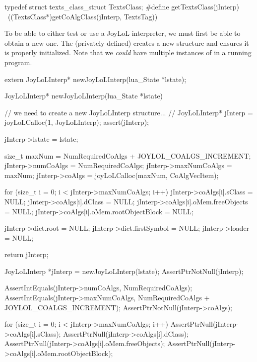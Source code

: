 typedef struct texts_class_struct TextsClass;
#define getTextsClass(jInterp)                              \
  ((TextsClass*)getCoAlgClass(jInterp, TextsTag))
\stopCHeader

\startTestSuite[newJoyLoLInterp]

To be able to either test or use a JoyLoL interpreter, we must first be 
able to obtain a new one. The (privately defined) \type{newJoyLoLInterp} 
creates a new  structure and ensures it is properly 
initialized. Note that we \emph{could} have multiple instances of 
\type{JoyLoLInterp} in a running program. 

\startCHeader
extern JoyLoLInterp* newJoyLoLInterp(lua_State *lstate);
\stopCHeader
{}

\startCCode
JoyLoLInterp* newJoyLoLInterp(lua_State *lstate) {
  // we need to create a new JoyLoLInterp structure...
  //
  JoyLoLInterp* jInterp = joyLoLCalloc(1, JoyLoLInterp);
  assert(jInterp);
  
  jInterp->lstate = lstate;
  
  size_t maxNum =
    NumRequiredCoAlgs + JOYLOL_COALGS_INCREMENT;
  jInterp->numCoAlgs    = NumRequiredCoAlgs;
  jInterp->maxNumCoAlgs = maxNum;
  jInterp->coAlgs    = joyLoLCalloc(maxNum, CoAlgVecItem);
  
  for (size_t i = 0; i < jInterp->maxNumCoAlgs; i++) {
    jInterp->coAlgs[i].sClass               = NULL;
    jInterp->coAlgs[i].dClass               = NULL;
    jInterp->coAlgs[i].oMem.freeObjects     = NULL;
    jInterp->coAlgs[i].oMem.rootObjectBlock = NULL; 
  }
  
  jInterp->dict.root        = NULL;
  jInterp->dict.firstSymbol = NULL;
  jInterp->loader           = NULL;
  
  return jInterp;
}
\stopCCode


\startCTest
  JoyLoLInterp *jInterp = newJoyLoLInterp(lstate);
  AssertPtrNotNull(jInterp);
  
  AssertIntEquals(jInterp->numCoAlgs,
    NumRequiredCoAlgs);
  AssertIntEquals(jInterp->maxNumCoAlgs,
    NumRequiredCoAlgs + JOYLOL_COALGS_INCREMENT);
  AssertPtrNotNull(jInterp->coAlgs);
  
  for (size_t i = 0; i < jInterp->maxNumCoAlgs; i++) {
    AssertPtrNull(jInterp->coAlgs[i].sClass);
    AssertPtrNull(jInterp->coAlgs[i].dClass);
    AssertPtrNull(jInterp->coAlgs[i].oMem.freeObjects);
    AssertPtrNull(jInterp->coAlgs[i].oMem.rootObjectBlock);
  }
  
